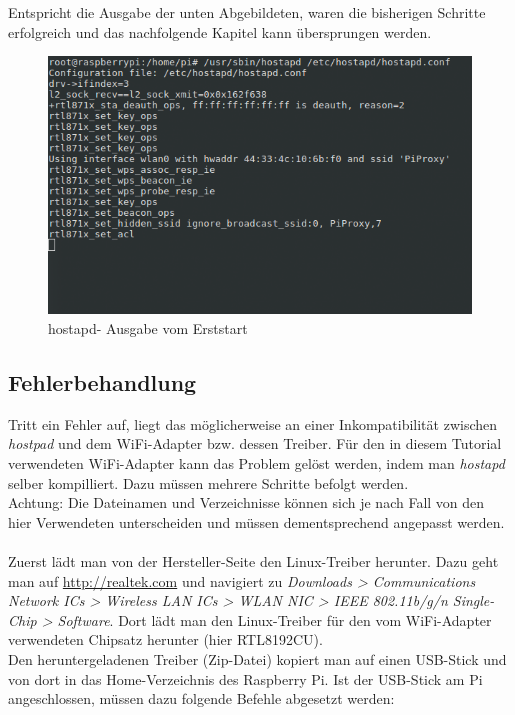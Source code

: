 Entspricht die Ausgabe der unten Abgebildeten, waren die bisherigen Schritte erfolgreich und das nachfolgende Kapitel kann übersprungen werden.

\begin{figure}[h]
\centering
\includegraphics[scale=0.7]{images/hostapd_firststart}
\caption{hostapd- Ausgabe vom Erststart}
\end{figure}

\subsection{Fehlerbehandlung}
Tritt ein Fehler auf, liegt das möglicherweise an einer Inkompatibilität zwischen \textit{hostpad} und dem WiFi-Adapter bzw. dessen Treiber. Für den in diesem Tutorial verwendeten WiFi-Adapter kann das Problem gelöst werden, indem man \textit{hostapd} selber kompilliert. Dazu müssen mehrere Schritte befolgt werden.
\\
Achtung: Die Dateinamen und Verzeichnisse können sich je nach Fall von den hier Verwendeten unterscheiden und müssen dementsprechend angepasst werden.
\\
\\
Zuerst lädt man von der Hersteller-Seite den Linux-Treiber herunter. Dazu geht man auf \url{http://realtek.com} und navigiert zu \textit{Downloads > Communications Network ICs > Wireless LAN ICs > WLAN NIC > IEEE 802.11b/g/n Single-Chip > Software}. Dort lädt man den Linux-Treiber für den vom  WiFi-Adapter verwendeten Chipsatz herunter (hier RTL8192CU).
\\
Den heruntergeladenen Treiber (Zip-Datei) kopiert man auf einen USB-Stick und von dort in das Home-Verzeichnis des Raspberry Pi. Ist der USB-Stick am Pi angeschlossen, müssen dazu folgende Befehle abgesetzt werden:

